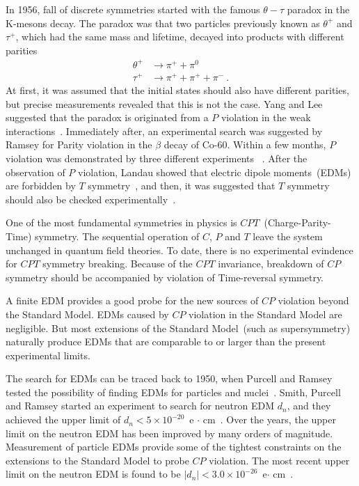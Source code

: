 In 1956, fall of discrete symmetries started with the famous
$\theta-\tau$ paradox in the K-mesons decay. The paradox was that two
particles previously known as $\theta^+$ and $\tau^+$, which had the
same mass and lifetime, decayed into products with different parities
\begin{equation}
  \begin{split}
    \theta^+ &\rightarrow \pi^+ + \pi^0 \\
    \tau^+ &\rightarrow \pi^+ + \pi^+ + \pi^-~.
  \end{split}
\end{equation}
At first, it was assumed that the initial states should also have
different parities, but precise measurements revealed that this is not
the case. Yang and Lee suggested that the paradox is originated from a
$P$ violation in the weak
interactions~\cite{lee1957parity}. Immediately after, an experimental
search was suggested by Ramsey for Parity violation in the $\beta$
decay of Co-60. Within a few months, $P$ violation was demonstrated by
three different experiments
~\cite{PhysRev.105.1413,PhysRev.105.1415,friedman1957nuclear}. After
the observation of $P$ violation, Landau showed that electric dipole
moments~(EDMs) are forbidden by $T$
symmetry~\cite{landau1957conservation}, and then, it was suggested
that $T$ symmetry should also be checked
experimentally~\cite{PhysRev.106.517}.

One of the most fundamental symmetries in physics is
$CPT$~(Charge-Parity-Time) symmetry. The sequential operation of $C$,
$P$ and $T$ leave the system unchanged in quantum field theories. To
date, there is no experimental evindence for $CPT$ symmetry
breaking. Because of the $CPT$ invariance, breakdown of $CP$ symmetry
should be accompanied by violation of Time-reversal symmetry.

A finite EDM provides a good probe for the new sources of $CP$
violation beyond the Standard Model. EDMs caused by $CP$ violation in
the Standard Model are negligible. But most extensions of the Standard
Model~(such as supersymmetry) naturally produce EDMs that are
comparable to or larger than the present experimental limits.

The search for EDMs can be traced back to 1950, when Purcell and
Ramsey tested the possibility of finding EDMs for particles and
nuclei~\cite{PhysRev.78.807}. Smith, Purcell and Ramsey started an
experiment to search for neutron EDM $d_n$, and they achieved the
upper limit of $d_n < 5 \times 10^{-20}$~e $\cdot$
cm~\cite{smith1957experimental}.  Over the years, the upper limit on
the neutron EDM has been improved by many orders of
magnitude. Measurement of particle EDMs provide some of the tightest
constraints on the extensions to the Standard Model to probe $CP$
violation. The most recent upper limit on the neutron EDM is found to
be $\vert d_n\vert < 3.0 \times 10^{-26} $~e$\cdot$
cm~\cite{pendlebury2015revised}.



